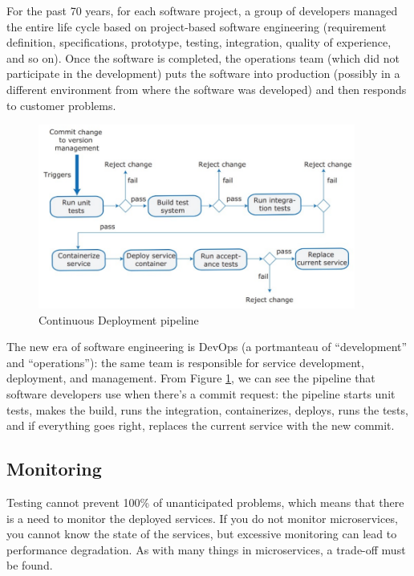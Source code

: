 For the past 70 years, for each software project, a group of developers managed the entire life cycle based on project-based software engineering (requirement definition, specifications, prototype, testing, integration, quality of experience, and so on). Once the software is completed, the operations team (which did not participate in the development) puts the software into production (possibly in a different environment from where the software was developed) and then responds to customer problems.

\begin{figure} [H]
    \centering
    \includegraphics[width=0.93\textwidth]{images/Microservices/DevOps.PNG}
    \caption{Continuous Deployment pipeline}
    \label{fig:DevOps}
\end{figure} 

The new era of software engineering is DevOps (a portmanteau of “development” and “operations”): the same team is responsible for service development, deployment, and management. From Figure \ref{fig:DevOps}, we can see the pipeline that software developers use when there's a commit request: the pipeline starts unit tests, makes the build, runs the integration, containerizes, deploys, runs the tests, and if everything goes right, replaces the current service with the new commit.

\subsection{Monitoring}

Testing cannot prevent 100\% of unanticipated problems, which means that there is a need to monitor the deployed services. If you do not monitor microservices, you cannot know the state of the services, but excessive monitoring can lead to performance degradation. As with many things in microservices, a trade-off must be found.

